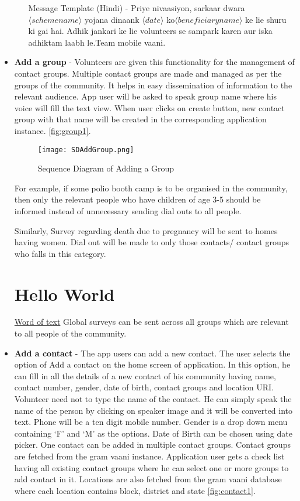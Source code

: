 \begin{itemize}
\begin{enumerate}
Message Template (Hindi) - Priye nivaasiyon​, sarkaar dwara $\langle schemename \rangle$ yojana dinaank $\langle date \rangle$ ko ​$\langle beneficiaryname \rangle$ ke lie ​shuru ki gai hai. Adhik jankari ke lie volunteers se sampark karen aur iska adhiktam laabh le.Team mobile vaani.
\end{enumerate}


\item \textbf {Add a group} - Volunteers are given this functionality for the management of contact groups. Multiple contact groups are made and managed as per the groups of the community. It helps in easy dissemination of information to the relevant audience. App user will be asked to speak group name where his voice will fill the text view. When user clicks on create button, new contact group with that name will be created in the corresponding application instance. \ref{fig:group1}.

\begin{figure}[H]
    \centering
	\texttt{[image: SDAddGroup.png]}
    \caption{ Sequence Diagram of Adding a Group}
    \label{fig:Sequence Diagram of Adding a Group}
\end{figure}

For example, if some polio booth camp is to be organised in the community, then only the relevant people who have children of age 3-5 should be informed instead of unnecessary sending dial outs to all people.

Similarly, Survey regarding death due to pregnancy will be sent to homes having women. Dial out will be made to only those contacts/ contact groups who falls in this category. 
\section{Hello World}
\label{sec:hello}

\hyperref[sec:hello]{Word of text}
Global surveys can be sent across all groups which are relevant to all people of the community.

 \item \textbf {Add a contact} - The app users can add a new contact. The user selects the option of Add a contact on the  home screen of application. In this option, he can fill in all the details of a new contact of his community having name, contact number, gender, date of birth, contact groups and location URI. Volunteer need not to type the name of the contact. He can simply speak the name of the person by clicking on speaker image and it will be converted into text. Phone will be a ten digit mobile number. Gender is a drop down menu containing ‘F’ and ‘M’ as the options. Date of Birth can be chosen using date picker. One contact can be added in multiple  contact groups. Contact groups are fetched from the gram vaani instance. Application user gets a check list having all existing contact groups where he can select one or more groups to add contact in it. Locations are also fetched from the gram vaani database where each location contains block, district and state \ref{fig:contact1}.
 

\end{itemize}
